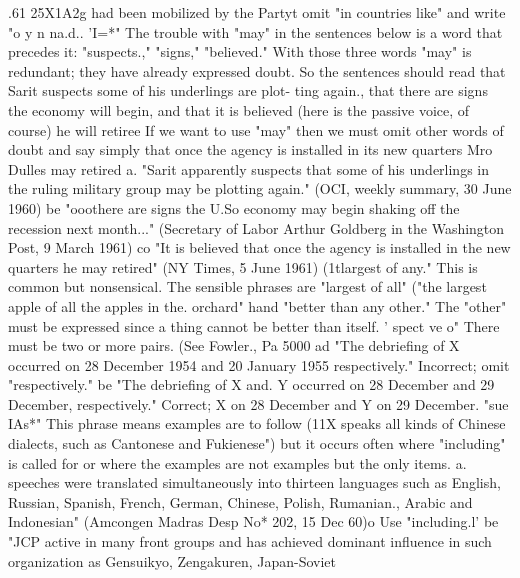 \documentclass[
    oneside,
    11pt,
    draft
]{memoir}
\begin{document}
.61 25X1A2g had been mobilized by the Partyt omit "in countries like" and write "o y n na.d.. 'I=*" The trouble with "may" in the sentences below is a word that precedes it: "suspects.," "signs," "believed." With those three words "may" is redundant; they have already expressed doubt. So the sentences should read that Sarit suspects some of his underlings are plot- ting again., that there are signs the economy will begin, and that it is believed (here is the passive voice, of course) he will retiree If we want to use "may" then we must omit other words of doubt and say simply that once the agency is installed in its new quarters Mro Dulles may retired a. "Sarit apparently suspects that some of his underlings in the ruling military group may be plotting again." (OCI, weekly summary, 30 June 1960) be "ooothere are signs the U.So economy may begin shaking off the recession next month..." (Secretary of Labor Arthur Goldberg in the Washington Post, 9 March 1961) co "It is believed that once the agency is installed in the new quarters he may retired" (NY Times, 5 June 1961) (1tlargest of any." This is common but nonsensical. The sensible phrases are "largest of all" ("the largest apple of all the apples in the. orchard" hand "better than any other." The "other" must be expressed since a thing cannot be better than itself. ' spect ve o" There must be two or more pairs. (See Fowler., Pa 5000 ad "The debriefing of X occurred on 28 December 1954 and 20 January 1955 respectively." Incorrect; omit "respectively." be "The debriefing of X and. Y occurred on 28 December and 29 December, respectively." Correct; X on 28 December and Y on 29 December. "sue IAs*" This phrase means examples are to follow (11X speaks all kinds of Chinese dialects, such as Cantonese and Fukienese") but it occurs often where "including" is called for or where the examples are not examples but the only items. a. speeches were translated simultaneously into thirteen languages such as English, Russian, Spanish, French, German, Chinese, Polish, Rumanian., Arabic and Indonesian" (Amcongen Madras Desp No* 202, 15 Dec 60)o Use "including.l' be "JCP active in many front groups and has achieved dominant influence in such organization as Gensuikyo, Zengakuren, Japan-Soviet
\end{document}
